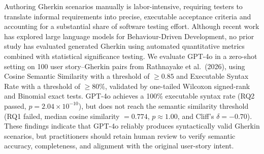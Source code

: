 Authoring Gherkin scenarios manually is labor-intensive, requiring testers to translate informal requirements into precise, executable acceptance criteria and accounting for a substantial share of software testing effort. Although recent work has explored large language models for Behaviour-Driven Development, no prior study has evaluated generated Gherkin using automated quantitative metrics combined with statistical significance testing. We evaluate GPT-4o in a zero-shot setting on 100 user story--Gherkin pairs from Rathnayake et al.~(2026), using Cosine Semantic Similarity with a threshold of $\geq 0.85$ and Executable Syntax Rate with a threshold of $\geq 80\%$, validated by one-tailed Wilcoxon signed-rank and Binomial exact tests. GPT-4o achieves a 100\% executable syntax rate (RQ2 passed, $p=2.04\times10^{-10}$), but does not reach the semantic similarity threshold (RQ1 failed, median cosine similarity $=0.774$, $p\approx1.00$, and Cliff's $\delta=-0.70$). These findings indicate that GPT-4o reliably produces syntactically valid Gherkin scenarios, but practitioners should retain human review to verify semantic accuracy, completeness, and alignment with the original user-story intent.
